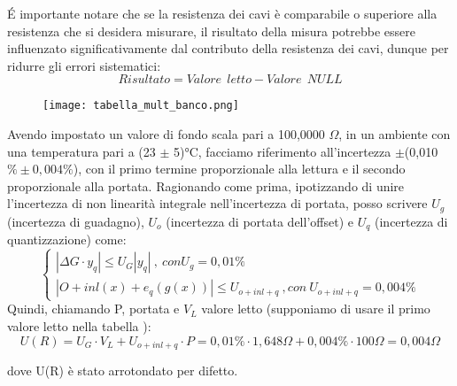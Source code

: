 \'E importante notare che se la resistenza dei cavi è comparabile o superiore alla resistenza che si desidera misurare, il risultato della misura potrebbe essere influenzato significativamente dal contributo della resistenza dei cavi, dunque per ridurre gli errori sistematici:
\begin{equation*}
    Risultato = Valore \ \ letto - Valore\ \ NULL
\end{equation*}

\begin{figure}[h]
    \centering
    \texttt{[image: tabella\_mult\_banco.png]}
    \label{fig:tab_mult_banco}
\end{figure}
\FloatBarrier

Avendo impostato un valore di fondo scala pari a 100,0000 $\Omega$, in un ambiente con una temperatura pari a (23 $\pm$ 5)°C, facciamo riferimento all'incertezza $\pm$(0,010 $\% \pm 0,004 \%$), con il primo termine proporzionale alla lettura e il secondo proporzionale alla portata.
Ragionando come prima, ipotizzando di unire l'incertezza di non linearità integrale nell'incertezza di portata, posso scrivere $U_g$ (incertezza di guadagno), $U_o$ (incertezza di portata dell'offset) e $U_q$ (incertezza di quantizzazione) come: 
\begin{equation}
\left\{\begin{array}{l}
| \Delta G \cdot y_q | \leq U_G |y_q| \ , \ con U_g=0,01\% \\ 
| O + inl(x) + e_q(g(x)) | \leq U_{o+inl+q} \ , con \ U_{o+inl+q}=0,004\%
\end{array}\right.
\end{equation}
Quindi, chiamando P, portata e $V_L$ valore letto (supponiamo di usare il primo valore letto nella tabella \label{mult_port}):
\begin{equation*}
    U(R) = U_G \cdot V_L + U_{o+inl+q} \cdot P = 0,01\% \cdot 1,648\Omega + 0,004 \% \cdot 100 \Omega = 0,004 \Omega 
\end{equation*}

dove U(R) è stato arrotondato per difetto.

